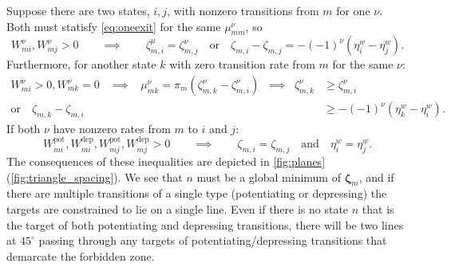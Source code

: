 \documentclass[12pt]{article}
\newcommand{\eqm}{\pi}
\newcommand{\etwm}{\eta^w}
\newcommand{\dgnm}{\zeta}
\newcommand{\dgn}{\boldsymbol{\dgnm}}
\newcommand{\Wm}{W}
\newcommand{\kktm}{\mu}
\newcommand{\pot}{^{\text{pot}}}
\newcommand{\dep}{^{\text{dep}}}
\begin{document}
Suppose there are two states, \(i,j\), with nonzero transitions from \(m\) for one \(\nu\).
Both must statisfy \cref{eq:oneexit} for the same \(\kktm^\nu_{mm}\), so
%
\begin{equation}\label{eq:twoexits}
  \Wm^\nu_{mi}, \Wm^\nu_{mj} > 0
  \qquad \implies \qquad
  \dgnm^\mu_{m,i} = \dgnm^\nu_{m,j}
  \quad \text{or}\quad
  \dgnm_{m,i} - \dgnm_{m,j} = - (-1)^\nu (\etwm_i - \etwm_j).
\end{equation}
%
Furthermore, for another state \(k\) with zero transition rate from \(m\) for the same \(\nu\):
%
\begin{equation}\label{eq:nonexit}
\begin{aligned}
  \Wm^\nu_{mi} > 0, \Wm^\nu_{mk} = 0 
  \;\;\; \implies \;\;\;
  \kktm^\nu_{mk} = \eqm_m (\dgnm^\nu_{m,k} - \dgnm^\nu_{m,i})
  \;\; \implies \;\;
  \dgnm^\nu_{m,k} &\geq \dgnm^\nu_{m,i} \\
  \text{or}\quad
  \dgnm_{m,k} - \dgnm_{m,i} &\geq - (-1)^\nu (\etwm_k - \etwm_i).
\end{aligned}
\end{equation}
%
If both \(\nu\) have nonzero rates from \(m\) to \(i\) and \(j\):
%
\begin{equation}\label{eq:twodoubleexits}
  \Wm\pot_{mi}, \Wm\dep_{mi}, \Wm\pot_{mj}, \Wm\dep_{mj} > 0
  \qquad \implies \qquad
  \dgnm_{m,i} = \dgnm_{m,j} 
  \quad \text{and} \quad
  \etwm_i = \etwm_j.
\end{equation}
%
The consequences of these inequalities are depicted in \cref{fig:planes}(\ref{fig:triangle_spacing}).
We see that \(n\) must be a global minimum of \(\dgn_m\), and if there are multiple transitions of a single type (potentiating or depressing) the targets are constrained to lie on a single line.
Even if there is no state \(n\) that is the target of both potentiating and depressing transitions, there will be two lines at \(45^\circ \) passing through any targets of potentiating/depressing transitions that demarcate the forbidden zone.
\end{document}
